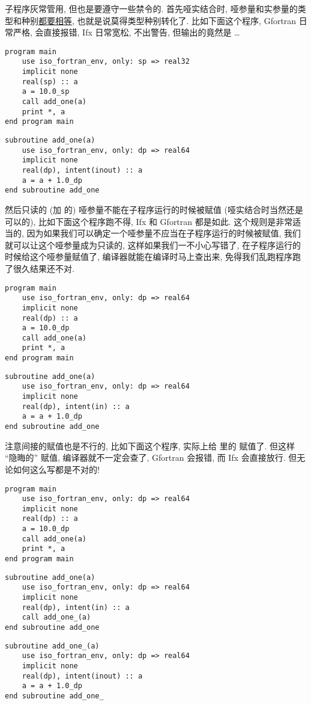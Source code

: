 子程序灰常管用, 但也是要遵守一些禁令的. 首先哑实结合时, 哑参量和实参量的类型和种别\uline{都要相等}, 也就是说莫得类型种别转化了. 比如下面这个程序, Gfortran 日常严格, 会直接报错, Ifx 日常宽松, 不出警告, 但输出的竟然是 \dots{}
\begin{lstlisting} 
program main
    use iso_fortran_env, only: sp => real32
    implicit none
    real(sp) :: a
    a = 10.0_sp
    call add_one(a)
    print *, a
end program main
\end{lstlisting}
\begin{lstlisting}
subroutine add_one(a)
    use iso_fortran_env, only: dp => real64
    implicit none
    real(dp), intent(inout) :: a
    a = a + 1.0_dp
end subroutine add_one
\end{lstlisting} 
然后只读的 (加  的) 哑参量不能在子程序运行的时候被赋值 (哑实结合时当然还是可以的), 比如下面这个程序跑不得, Ifx 和 Gfortran 都是如此. 这个规则是非常适当的, 因为如果我们可以确定一个哑参量不应当在子程序运行的时候被赋值, 我们就可以让这个哑参量成为只读的, 这样如果我们一不小心写错了, 在子程序运行的时候给这个哑参量赋值了, 编译器就能在编译时马上查出来, 免得我们乱跑程序跑了很久结果还不对. 
\begin{lstlisting} 
program main
    use iso_fortran_env, only: dp => real64
    implicit none
    real(dp) :: a
    a = 10.0_dp
    call add_one(a)
    print *, a
end program main
\end{lstlisting}
\begin{lstlisting}
subroutine add_one(a)
    use iso_fortran_env, only: dp => real64
    implicit none
    real(dp), intent(in) :: a
    a = a + 1.0_dp
end subroutine add_one
\end{lstlisting} 
注意间接的赋值也是不行的, 比如下面这个程序,  实际上给  里的  赋值了. 但这样 ``隐晦的'' 赋值, 编译器就不一定会查了, Gfortran 会报错, 而 Ifx 会直接放行. 但无论如何这么写都是不对的!\label{secret_assignment} 
\begin{lstlisting} 
program main
    use iso_fortran_env, only: dp => real64
    implicit none
    real(dp) :: a
    a = 10.0_dp
    call add_one(a)
    print *, a
end program main
\end{lstlisting}
\begin{lstlisting}
subroutine add_one(a)
    use iso_fortran_env, only: dp => real64
    implicit none
    real(dp), intent(in) :: a
    call add_one_(a)
end subroutine add_one
\end{lstlisting}
\begin{lstlisting}
subroutine add_one_(a)
    use iso_fortran_env, only: dp => real64
    implicit none
    real(dp), intent(inout) :: a
    a = a + 1.0_dp
end subroutine add_one_
\end{lstlisting} 

